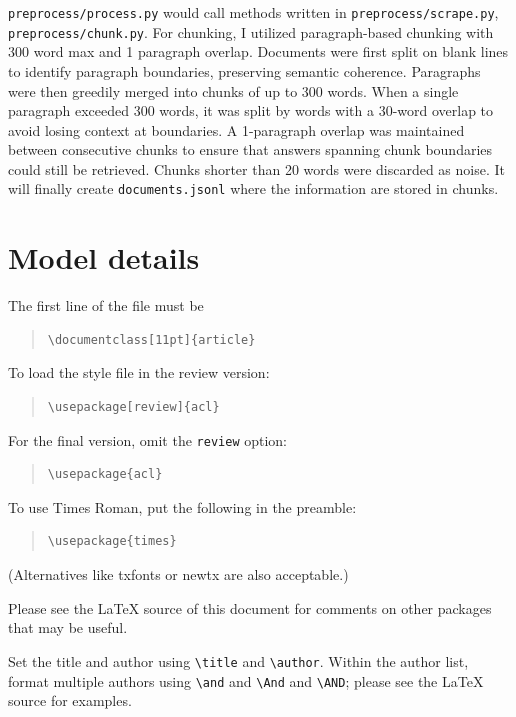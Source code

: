 \documentclass[11pt]{article}
\begin{document}
\texttt{preprocess/process.py} would call methods written in \texttt{preprocess/scrape.py}, \texttt{preprocess/chunk.py}. For chunking, I utilized paragraph-based chunking with 300 word max and 1 paragraph overlap. Documents were first split on blank lines to identify paragraph boundaries, preserving semantic coherence. Paragraphs were then greedily merged into chunks of up to 300 words. When a single paragraph exceeded 300 words, it was split by words with a 30-word overlap to avoid losing context at boundaries. A 1-paragraph overlap was maintained between consecutive chunks to ensure that answers spanning chunk boundaries could still be retrieved. Chunks shorter than 20 words were discarded as noise. It will finally create \texttt{documents.jsonl} where the information are stored in chunks.

\section{Model details}

The first line of the file must be
\begin{quote}
\begin{verbatim}
\documentclass[11pt]{article}
\end{verbatim}
\end{quote}

To load the style file in the review version:
\begin{quote}
\begin{verbatim}
\usepackage[review]{acl}
\end{verbatim}
\end{quote}
For the final version, omit the \verb|review| option:
\begin{quote}
\begin{verbatim}
\usepackage{acl}
\end{verbatim}
\end{quote}

To use Times Roman, put the following in the preamble:
\begin{quote}
\begin{verbatim}
\usepackage{times}
\end{verbatim}
\end{quote}
(Alternatives like txfonts or newtx are also acceptable.)

Please see the \LaTeX{} source of this document for comments on other packages that may be useful.

Set the title and author using \verb|\title| and \verb|\author|. Within the author list, format multiple authors using \verb|\and| and \verb|\And| and \verb|\AND|; please see the \LaTeX{} source for examples.
\end{document}
